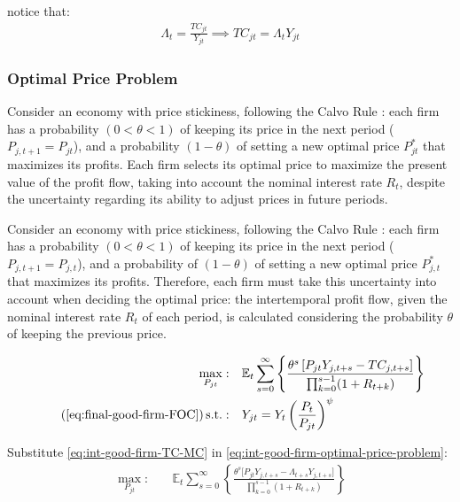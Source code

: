 \documentclass[
	12pt, 
	]{article}
\numberwithin{equation}{section}
\DeclareMathOperator{\st}{s.t.}
\newcommand{\E}[1][t]{{\mathbb{E}_{#1}}}
\theoremstyle{definition}
\theoremstyle{plain}
\theoremstyle{plain}
\theoremstyle{plain}
\begin{document}
notice that:
\begin{align}
\label{eq:int-good-firm-TC-MC}
	\Lambda_t = \frac{TC_{jt}}{Y_{jt}} \implies 
	TC_{jt} = \Lambda_t Y_{jt}
\end{align}


\subsubsection*{Optimal Price Problem}

Consider an economy with price stickiness, following the Calvo Rule \cite{calvo_staggered_1983}: each firm has a probability $(0 < \theta < 1)$ of keeping its price in the next period ($P_{j,t+1} = P_{jt}$), and a probability $(1 - \theta)$ of setting a new optimal price $P_{jt}^\ast$ that maximizes its profits. Each firm selects its optimal price to maximize the present value of the profit flow, taking into account the nominal interest rate $R_t$, despite the uncertainty regarding its ability to adjust prices in future periods.


Consider an economy with price stickiness, following the Calvo Rule \cite{calvo_staggered_1983}: each firm has a probability $(0 < \theta < 1)$ of keeping its price in the next period ($P_{j,t+1} = P_{j,t}$), and a probability of $(1 - \theta)$ of setting a new optimal price $P_{j,t}^\ast$ that maximizes its profits. Therefore, each firm must take this uncertainty into account when deciding the optimal price: the intertemporal profit flow, given the nominal interest rate $R_t$ of each period, is calculated considering the probability $\theta$ of keeping the previous price.



\begin{align}
\label{eq:int-good-firm-optimal-price-problem}
	\max_{P_{jt}}: & \quad \E \sum_{s=0}^{\infty} \left\{ \frac{ \theta^s \left[ P_{jt} Y_{j,t+s} - TC_{j,t+s} \right] }{\prod_{k=0}^{s-1}(1+R_{t+k})} \right\} \\
\tag{\ref{eq:final-good-firm-FOC}}
	\st: & \quad Y_{jt} = Y_t \left( \frac{P_t}{P_{jt}} \right)^{\psi}
\end{align}


Substitute \ref{eq:int-good-firm-TC-MC} in \ref{eq:int-good-firm-optimal-price-problem}:
\begin{align}
\label{eq:int-good-firm-optimal-price-problem-2}
	\max_{P_{jt}}: & \quad \E \sum_{s=0}^{\infty} \left\{ \frac{\theta^s \big[ P_{jt} Y_{j,t+s} - \Lambda_{t+s} Y_{j,t+s} \big]}{\prod_{k=0}^{s-1}(1+R_{t+k})} \right\}
\end{align}
\end{document}
